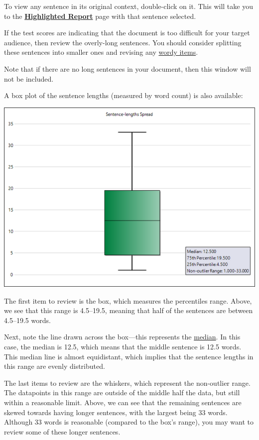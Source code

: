 \documentclass[
]{book}
\theoremstyle{definition}
\theoremstyle{definition}
\theoremstyle{definition}
\theoremstyle{definition}
\theoremstyle{remark}
\begin{document}
To view any sentence in its original context, double-click on it. This will take you to the \protect\hyperlink{reviewing-standard-grammar}{\textbf{Highlighted Report}} page with that sentence selected.

If the test scores are indicating that the document is too difficult for your target audience, then review the overly-long sentences. You should consider splitting these sentences into smaller ones and revising any \protect\hyperlink{reviewing-wordy-items}{wordy items}.

Note that if there are no long sentences in your document, then this window will not be included.

A box plot of the sentence lengths (measured by word count) is also available:

\begin{center}\includegraphics[width=0.75\linewidth,]{Images/SentencesBoxplot} \end{center}

The first item to review is the box, which measures the percentiles range. Above, we see that this range is 4.5--19.5, meaning that half of the sentences are between 4.5--19.5 words.

Next, note the line drawn across the box---this represents the \protect\hyperlink{stat-terms}{median}. In this case, the median is 12.5, which means that the middle sentence is 12.5 words. This median line is almost equidistant, which implies that the sentence lengths in this range are evenly distributed.

The last items to review are the whiskers, which represent the non-outlier range. The datapoints in this range are outside of the middle half the data, but still within a reasonable limit. Above, we can see that the remaining sentences are skewed towards having longer sentences, with the largest being 33 words. Although 33 words is reasonable (compared to the box's range), you may want to review some of these longer sentences.
\end{document}

